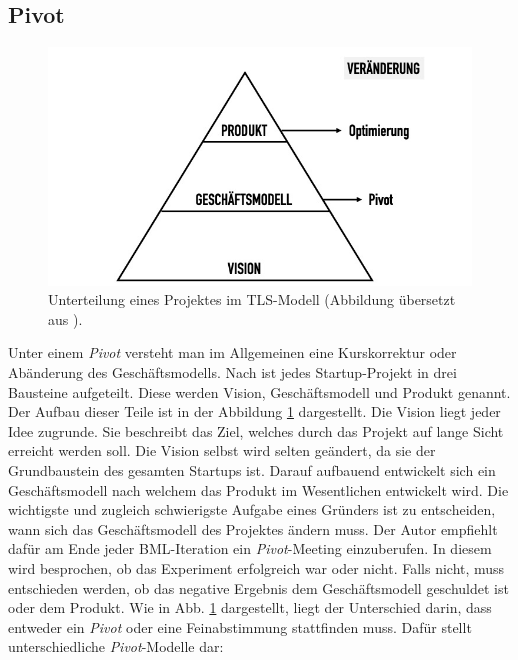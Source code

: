 \subsection*{\label{sec:LeanStartup-Pivot}\thesubsection\quad Pivot}
\begin{figure}
	\begin{center}
		\includegraphics[scale=0.5]{99_IMG/02_Grundlagen/visionStrategyProduct.jpg}
		\caption[Unterteilung eines Projektes im \ac{TLS}-Modell.]{Unterteilung eines Projektes im \ac{TLS}-Modell (Abbildung übersetzt aus ).}
		\label{fig:LeanStartup_VisionStrategyProduct}
	\end{center}
\end{figure}
Unter einem \textit{Pivot} versteht man im Allgemeinen eine Kurskorrektur oder Abänderung des Geschäftsmodells. Nach \citeauthor{TheLeanStartup} ist jedes Startup-Projekt in drei Bausteine aufgeteilt. Diese werden Vision, Geschäftsmodell und Produkt genannt. Der Aufbau dieser Teile ist in der Abbildung \ref{fig:LeanStartup_VisionStrategyProduct} dargestellt. 
Die Vision liegt jeder Idee zugrunde. Sie beschreibt das Ziel, welches durch das Projekt auf lange Sicht erreicht werden soll. Die Vision selbst wird selten geändert, da sie der Grundbaustein des gesamten Startups ist. Darauf aufbauend entwickelt sich ein Geschäftsmodell nach welchem das Produkt im Wesentlichen entwickelt wird. Die wichtigste und zugleich schwierigste Aufgabe eines Gründers ist zu entscheiden, wann sich das Geschäftsmodell des Projektes ändern muss. Der Autor empfiehlt dafür am Ende jeder \ac{BML}-Iteration ein \textit{Pivot}-Meeting einzuberufen. In diesem wird besprochen, ob das Experiment erfolgreich war oder nicht. Falls nicht, muss entschieden werden, ob das negative Ergebnis dem Geschäftsmodell geschuldet ist oder dem Produkt. Wie in Abb. \ref{fig:LeanStartup_VisionStrategyProduct} dargestellt, liegt der Unterschied darin, dass entweder ein \textit{Pivot} oder eine Feinabstimmung stattfinden muss. Dafür stellt \citeauthor{TheLeanStartup} unterschiedliche \textit{Pivot}-Modelle dar:
